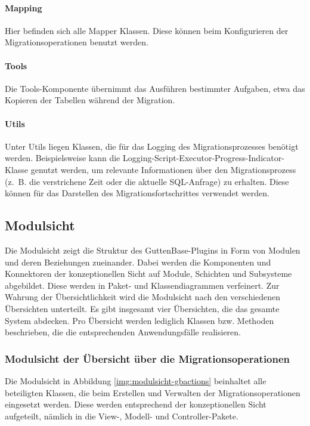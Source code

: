 	\paragraph*{Mapping}
	Hier befinden sich alle Mapper Klassen. Diese können beim Konfigurieren der Migrationsoperationen benutzt werden.
	\paragraph*{Tools}
 	Die Tools-Komponente übernimmt das Ausführen bestimmter Aufgaben, etwa das Kopieren der Tabellen während der Migration.
 	\paragraph*{Utils}
	Unter Utils liegen Klassen, die für das Logging des Migrationsprozesses benötigt werden. Beispielsweise kann die Logging-Script-Executor-Progress-Indicator-Klasse genutzt werden, um relevante Informationen über den Migrationsprozess (z. B. die verstrichene Zeit oder die aktuelle SQL-Anfrage) zu erhalten.
	Diese können für das Darstellen des Migrationsfortschrittes verwendet werden.
	
	
	
	\subsection{Modulsicht}
	Die Modulsicht zeigt die Struktur des GuttenBase-Plugins in Form von Modulen und deren Beziehungen zueinander. Dabei werden die Komponenten und Konnektoren der konzeptionellen Sicht auf Module, Schichten und Subsysteme abgebildet. Diese werden in Paket- und Klassendiagrammen verfeinert. Zur Wahrung der Übersichtlichkeit wird die Modulsicht nach den verschiedenen Übersichten unterteilt. Es gibt insgesamt vier Übersichten, die das gesamte System abdecken. Pro Übersicht werden lediglich Klassen bzw. Methoden beschrieben, die die entsprechenden Anwendungsfälle realisieren.
	
	\subsubsection{Modulsicht der Übersicht über die Migrationsoperationen}

	Die Modulsicht in Abbildung \ref{img:modulsicht-gbactions} beinhaltet alle beteiligten Klassen, die beim Erstellen und Verwalten der Migrationsoperationen eingesetzt werden. Diese werden entsprechend der konzeptionellen Sicht aufgeteilt, nämlich in die View-, Modell- und Controller-Pakete.
	
